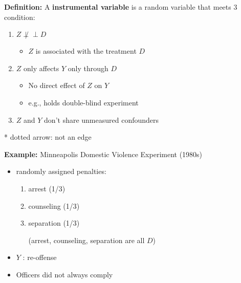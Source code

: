 \textbf{Definition:} A \textbf{instrumental variable} is a random variable that meets 3 condition: 
\begin{enumerate}
    \item {} $Z \not \perp\!\!\!\perp D$
    \begin{itemize}
    \item \( Z \) is associated with the treatment \( D \)
    \end{itemize}
    \item  {}\( Z \) only affects \( Y \) only through \( D \)
    \begin{itemize}
    \item No direct effect of \( Z \) on \( Y \)
    \item e.g., holds double-blind experiment 
    \end{itemize}
 \item {} \( Z \) and \( Y \) don't share unmeasured confounders
\end{enumerate}

\begin{center}
\end{center}
* dotted arrow: not an edge

\textbf{Example:} Minneapolis Domestic Violence Experiment (1980s)

\begin{itemize}
\item randomly assigned penalties:
\begin{enumerate}
\item arrest (1/3)
\item counseling (1/3)
\item separation (1/3)

(arrest, counseling, separation are all \( D \))
\end{enumerate}
\item \( Y \) : re-offense
\item Officers did not always comply
\end{itemize}